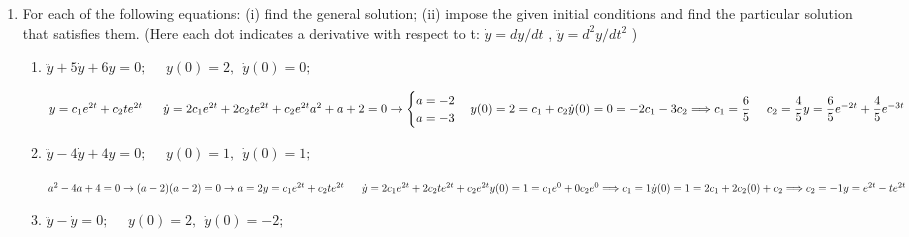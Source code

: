 \documentclass[fleqn]{article}
\begin{document}
\begin{enumerate}
    \item  For each of the following equations: (i) find the general solution; (ii) impose the given initial conditions and find the particular solution that satisfies them. (Here each dot indicates a derivative with respect to t: $\dot y = dy/dt$ , $\ddot y = d^2y/dt^2$ )
      \begin{enumerate}
        \item $\ddot y+5\dot y+6y=0; ~~~~~~ y(0)=2, ~~ \dot y(0)=0;$

        \textcolor{hwColor}{
          $
            y=c_1e^{2t}+c_2te^{2t} ~~~~~ \dot y=2c_1e^{2t}+2c_2te^{2t}+c_2e^{2t} \\
            \\
            a^2+a+2=0 \rightarrow \begin{cases}
              a=-2 \\
              a=-3 \\
            \end{cases} \\
            \\
            y(0)=2=c_1+c_2 \\
            \dot y(0)=0=-2c_1-3c_2 \\
            \Longrightarrow c_1=\dfrac{6}{5} ~~~~ c_2=\dfrac{4}{5}
            \\
            \\
            y=\dfrac{6}{5}e^{-2t}+\dfrac{4}{5}e^{-3t}
          $     
        }

        \item $\ddot y-4\dot y+4y=0; ~~~~~~ y(0)=1, ~~ \dot y(0)=1;$

          \textcolor{hwColor}{
            $
              a^2-4a+4=0 \rightarrow (a-2)(a-2)=0 \rightarrow a=2 \\
              \\
              y=c_1e^{2t}+c_2te^{2t} ~~~~~ \dot y=2c_1e^{2t}+2c_2te^{2t}+c_2e^{2t} \\
              \\
              \\
              y(0)=1=c_1e^0+0c_2e^0 \Longrightarrow c_1=1 \\
              \dot y(0)=1=2c_1+2c_2(0)+c_2 \Longrightarrow c_2=-1
              \\
              \\
              y=e^{2t}-te^{2t}
            $     
          }

        \item $\ddot y-\dot y=0; ~~~~~~ y(0)=2, ~~ \dot y(0)=-2;$


\end{enumerate}
\end{enumerate}
\end{document}
